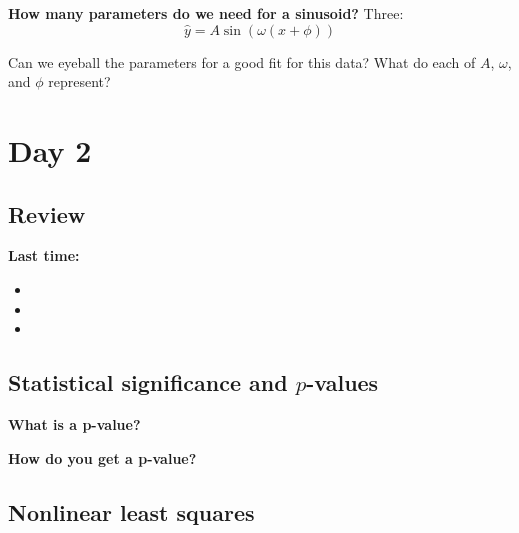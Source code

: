 \documentclass{article}
\begin{document}
\textbf{How many parameters do we need for a sinusoid?} Three:
\[
    \hat y = A \sin(\omega(x + \phi))
\]

Can we eyeball the parameters for a good fit for this data? What do each of $A$, $\omega$, and $\phi$ represent?

\section*{Day 2}

\subsection*{Review}

\textbf{Last time:}
\begin{itemize}
    \item 
    \item 
    \item 
\end{itemize}

\subsection*{Statistical significance and $p$-values}

\textbf{What is a p-value?}

\textbf{How do you get a p-value?}

\textbf{}


\subsection*{Nonlinear least squares}
\end{document}
